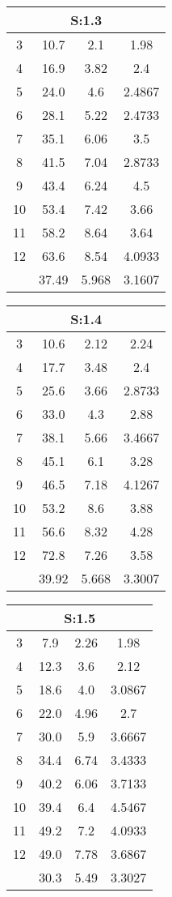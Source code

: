 \begin{table}[H]
		\begin{tabular}{c|ccc}
			\multicolumn{4}{c}{S:1.3}\\\hline
			3 & 10.7 & 2.1 & 1.98\\
			4 & 16.9 & 3.82 & 2.4\\
			5 & 24.0 & 4.6 & 2.4867\\
			6 & 28.1 & 5.22 & 2.4733\\
			7 & 35.1 & 6.06 & 3.5\\
			8 & 41.5 & 7.04 & 2.8733\\
			9 & 43.4 & 6.24 & 4.5\\
			10 & 53.4 & 7.42 & 3.66\\
			11 & 58.2 & 8.64 & 3.64\\
			12 & 63.6 & 8.54 & 4.0933\\
			\hline
			& 37.49 & 5.968 & 3.1607\\
		\end{tabular}
	\end{table}
	\begin{table}[H]
		\begin{tabular}{c|ccc}
			\multicolumn{4}{c}{S:1.4}\\\hline
			3 & 10.6 & 2.12 & 2.24\\
			4 & 17.7 & 3.48 & 2.4\\
			5 & 25.6 & 3.66 & 2.8733\\
			6 & 33.0 & 4.3 & 2.88\\
			7 & 38.1 & 5.66 & 3.4667\\
			8 & 45.1 & 6.1 & 3.28\\
			9 & 46.5 & 7.18 & 4.1267\\
			10 & 53.2 & 8.6 & 3.88\\
			11 & 56.6 & 8.32 & 4.28\\
			12 & 72.8 & 7.26 & 3.58\\
			\hline
			& 39.92 & 5.668 & 3.3007\\
		\end{tabular}
	\end{table}
	\begin{table}[H]
		\begin{tabular}{c|ccc}
			\multicolumn{4}{c}{S:1.5}\\\hline
			3 & 7.9 & 2.26 & 1.98\\
			4 & 12.3 & 3.6 & 2.12\\
			5 & 18.6 & 4.0 & 3.0867\\
			6 & 22.0 & 4.96 & 2.7\\
			7 & 30.0 & 5.9 & 3.6667\\
			8 & 34.4 & 6.74 & 3.4333\\
			9 & 40.2 & 6.06 & 3.7133\\
			10 & 39.4 & 6.4 & 4.5467\\
			11 & 49.2 & 7.2 & 4.0933\\
			12 & 49.0 & 7.78 & 3.6867\\
			\hline
			& 30.3 & 5.49 & 3.3027\\
		\end{tabular}
	\end{table}
